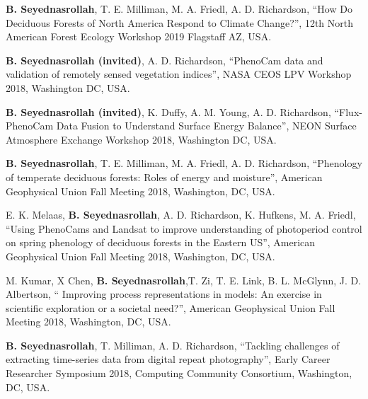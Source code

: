 \documentclass[10pt]{article}
\newenvironment{changemargin}[2]{%
  \begin{list}{}{%
 \setlength{\topsep}{0pt}%
 \setlength{\leftmargin}{#1}%
 \setlength{\rightmargin}{#2}%
 \setlength{\listparindent}{\parindent}%
 \setlength{\itemindent}{\parindent}%
 \setlength{\parsep}{\parskip}%
  }%
  \item[]}{\end{list}
}
\newenvironment{body} {
  \vspace*{-2pt}
  \begin{changemargin}{-0.5in}{-0.5in}
}
{\end{changemargin}
}
\begin{document}
\begin{body}
  \begin{etaremune}

    \item \textbf{B. Seyednasrollah}, T. E. Milliman, M. A. Friedl, A. D. Richardson, ``How Do Deciduous Forests of North America Respond to Climate Change?'', 12th North American Forest Ecology Workshop 2019 Flagstaff AZ, USA.\\
    \medskip

    \item \textbf{B. Seyednasrollah (invited)}, A. D. Richardson, ``PhenoCam data and validation of remotely sensed vegetation indices'', NASA CEOS LPV Workshop 2018, Washington DC, USA. \\
    \medskip

    \item \textbf{B. Seyednasrollah (invited)}, K. Duffy, A. M. Young, A. D. Richardson, ``Flux-PhenoCam Data Fusion to Understand Surface Energy Balance'', NEON Surface Atmosphere Exchange Workshop 2018, Washington DC, USA. \\
    \medskip

    \item \textbf{B. Seyednasrollah}, T. E. Milliman, M. A. Friedl, A. D. Richardson, ``Phenology of temperate deciduous forests: Roles of energy and moisture'', American Geophysical Union Fall Meeting 2018, Washington, DC, USA.\\
    \medskip

    \item E. K. Melaas, \textbf{B. Seyednasrollah}, A. D. Richardson, K. Hufkens, M. A. Friedl, ``Using PhenoCams and Landsat to improve understanding of photoperiod control on spring phenology of deciduous forests in the Eastern US'', American Geophysical Union Fall Meeting 2018, Washington, DC, USA.\\
    \medskip

    \item M. Kumar, X Chen, \textbf{B. Seyednasrollah},T. Zi, T. E. Link, B. L. McGlynn, J. D. Albertson, `` Improving process representations in models: An exercise in scientific exploration or a societal need?'', American Geophysical Union Fall Meeting 2018, Washington, DC, USA.\\
    \medskip


    \item \textbf{B. Seyednasrollah}, T. Milliman, A. D. Richardson, ``Tackling challenges of extracting time-series data from digital repeat photography'', Early Career Researcher Symposium 2018, Computing Community Consortium, Washington, DC, USA.\\
    \medskip


\end{etaremune}
\end{body}
\end{document}
